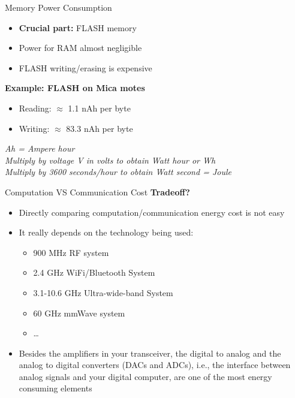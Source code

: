 \documentclass[aspectratio=169,11pt]{beamer}
\begin{document}
\begin{frame}{Memory Power Consumption}
    \begin{itemize}
        \item \textbf{Crucial part:} FLASH memory
        \item Power for RAM almost negligible
        \item FLASH writing/erasing is expensive
    \end{itemize}
    
    \vspace{0.3cm}
    \textbf{Example: FLASH on Mica motes}
    \begin{itemize}
        \item Reading: $\approx$ 1.1 nAh per byte
        \item Writing: $\approx$ 83.3 nAh per byte
    \end{itemize}
    
    \vspace{0.3cm}
    \small
    \textit{Ah = Ampere hour}\\
    \textit{Multiply by voltage V in volts to obtain Watt hour or Wh}\\
    \textit{Multiply by 3600 seconds/hour to obtain Watt second = Joule}
\end{frame}

\begin{frame}{Computation VS Communication Cost}
    \textbf{Tradeoff?}
    \begin{itemize}
        \item Directly comparing computation/communication energy cost is not easy
        \item It really depends on the technology being used:
        \begin{itemize}
            \item 900 MHz RF system
            \item 2.4 GHz WiFi/Bluetooth System
            \item 3.1-10.6 GHz Ultra-wide-band System
            \item 60 GHz mmWave system
            \item \ldots
        \end{itemize}
        \item Besides the amplifiers in your transceiver, the digital to analog and the analog to digital converters (DACs and ADCs), i.e., the interface between analog signals and your digital computer, are one of the most energy consuming elements
    \end{itemize}
\end{frame}
\end{document}

